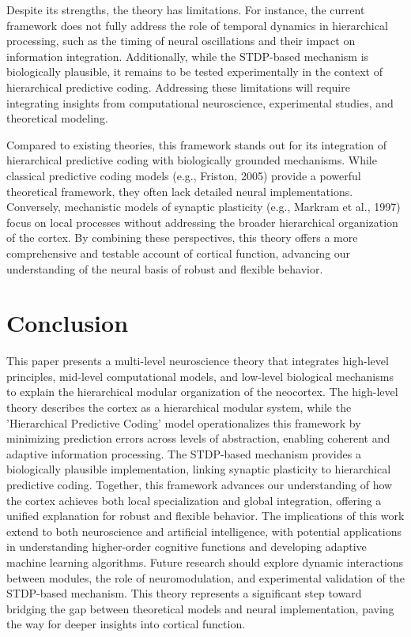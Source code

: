 \documentclass{article}
\begin{document}
Despite its strengths, the theory has limitations. For instance, the current framework does not fully address the role of temporal dynamics in hierarchical processing, such as the timing of neural oscillations and their impact on information integration. Additionally, while the STDP-based mechanism is biologically plausible, it remains to be tested experimentally in the context of hierarchical predictive coding. Addressing these limitations will require integrating insights from computational neuroscience, experimental studies, and theoretical modeling.

Compared to existing theories, this framework stands out for its integration of hierarchical predictive coding with biologically grounded mechanisms. While classical predictive coding models (e.g., Friston, 2005) provide a powerful theoretical framework, they often lack detailed neural implementations. Conversely, mechanistic models of synaptic plasticity (e.g., Markram et al., 1997) focus on local processes without addressing the broader hierarchical organization of the cortex. By combining these perspectives, this theory offers a more comprehensive and testable account of cortical function, advancing our understanding of the neural basis of robust and flexible behavior.

\section{Conclusion}
This paper presents a multi-level neuroscience theory that integrates high-level principles, mid-level computational models, and low-level biological mechanisms to explain the hierarchical modular organization of the neocortex. The high-level theory describes the cortex as a hierarchical modular system, while the 'Hierarchical Predictive Coding' model operationalizes this framework by minimizing prediction errors across levels of abstraction, enabling coherent and adaptive information processing. The STDP-based mechanism provides a biologically plausible implementation, linking synaptic plasticity to hierarchical predictive coding. Together, this framework advances our understanding of how the cortex achieves both local specialization and global integration, offering a unified explanation for robust and flexible behavior. The implications of this work extend to both neuroscience and artificial intelligence, with potential applications in understanding higher-order cognitive functions and developing adaptive machine learning algorithms. Future research should explore dynamic interactions between modules, the role of neuromodulation, and experimental validation of the STDP-based mechanism. This theory represents a significant step toward bridging the gap between theoretical models and neural implementation, paving the way for deeper insights into cortical function.
\end{document}
